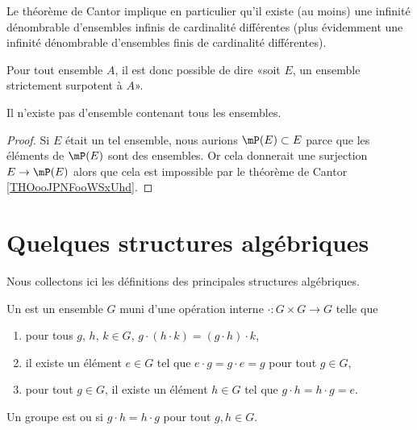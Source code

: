 \begin{normaltext}\label{NORooSensEnsSurpotent}
	Le théorème de Cantor implique en particulier qu'il existe (au moins) une infinité dénombrable d'ensembles infinis de cardinalité différentes (plus évidemment une infinité dénombrable d'ensembles finis de cardinalité différentes).

	Pour tout ensemble \( A\), il est donc possible de dire «soit \( E\), un ensemble strictement surpotent à \( A\)».
\end{normaltext}

\begin{corollary}       \label{CORooZMAOooPfJosM}
	Il n'existe pas d'ensemble contenant tous les ensembles.
\end{corollary}

\begin{proof}
	Si \( E\) était un tel ensemble, nous aurions \( \mP(E)\subset E\) parce que les éléments de \( \mP(E)\) sont des ensembles. Or cela donnerait une surjection \( E\to \mP(E)\) alors que cela est impossible par le théorème de Cantor \ref{THOooJPNFooWSxUhd}.
\end{proof}




\section{Quelques structures algébriques}
\label{SECooStructuresAlgebriques}

\begin{normaltext}\label{NORMooIntroStructuresAlgebriques}
	Nous collectons ici les définitions des principales structures algébriques.
\end{normaltext}

\begin{definition}[Groupe]      \label{DEFooBMUZooLAfbeM}
	Un  est un ensemble \( G\) muni d'une opération interne \( \cdot\colon G\times G\to G\) telle que
	\begin{enumerate}
		\item
		      pour tous \( g\), \( h\), \( k\in G\), \( g\cdot(h\cdot k)=(g\cdot h)\cdot k\),
		\item
		      il existe un élément \( e\in G\) tel que \( e\cdot g=g\cdot e=g\) pour tout \( g\in G\),
		\item
		      pour tout \( g\in G\), il existe un élément \( h\in  G\) tel que \(g\cdot h=h\cdot g=e \).
	\end{enumerate}
	Un groupe est  ou  si \( g\cdot h=h\cdot g\) pour tout \( g,h\in G\).
\end{definition}

